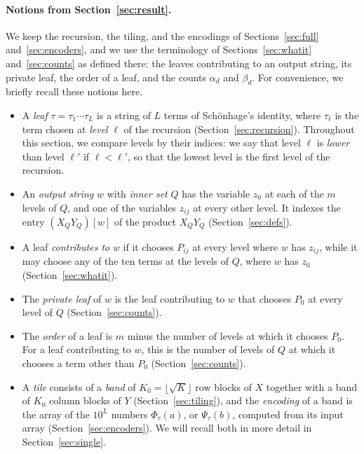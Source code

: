 \paragraph{Notions from Section~\ref{sec:result}.}
We keep the recursion, the tiling, and the encodings of Sections~\ref{sec:full} and~\ref{sec:encoders}, and we use the terminology of Sections~\ref{sec:whatit} and~\ref{sec:counts} as defined there: the leaves contributing to an output string, its private leaf, the order of a leaf, and the counts $\alpha_d$ and $\beta_d$. For convenience, we briefly recall these notions here.
\begin{itemize}[nosep]
\item A \emph{leaf} $\tau=\tau_1\cdots\tau_L$ is a string of $L$ terms of Sch\"onhage's identity, where $\tau_\ell$ is the term chosen at \emph{level} $\ell$ of the recursion (Section~\ref{sec:recursion}). Throughout this section, we compare levels by their indices: we say that level $\ell$ is \emph{lower} than level $\ell'$ if $\ell<\ell'$, so that the lowest level is the first level of the recursion.
\item An \emph{output string} $w$ with \emph{inner set} $Q$ has the variable $z_0$ at each of the $m$ levels of $Q$, and one of the variables $z_{ij}$ at every other level. It indexes the entry $(X_QY_Q)[w]$ of the product $X_QY_Q$ (Section~\ref{sec:defs}).
\item A leaf \emph{contributes to} $w$ if it chooses $P_{ij}$ at every level where $w$ has $z_{ij}$, while it may choose any of the ten terms at the levels of $Q$, where $w$ has $z_0$ (Section~\ref{sec:whatit}).
\item The \emph{private leaf} of $w$ is the leaf contributing to $w$ that chooses $P_0$ at every level of $Q$ (Section~\ref{sec:counts}).
\item The \emph{order} of a leaf is $m$ minus the number of levels at which it chooses $P_0$. For a leaf contributing to $w$, this is the number of levels of $Q$ at which it chooses a term other than $P_0$ (Section~\ref{sec:counts}).
\item A \emph{tile} consists of a \emph{band} of $K_0=\lfloor\sqrt K\rfloor$ row blocks of $X$ together with a band of $K_0$ column blocks of $Y$ (Section~\ref{sec:tiling}), and the \emph{encoding} of a band is the array of the $10^L$ numbers $\Phi_\tau(a)$, or $\Psi_\tau(b)$, computed from its input array (Section~\ref{sec:encoders}). We will recall both in more detail in Section~\ref{sec:single}.
\end{itemize}

